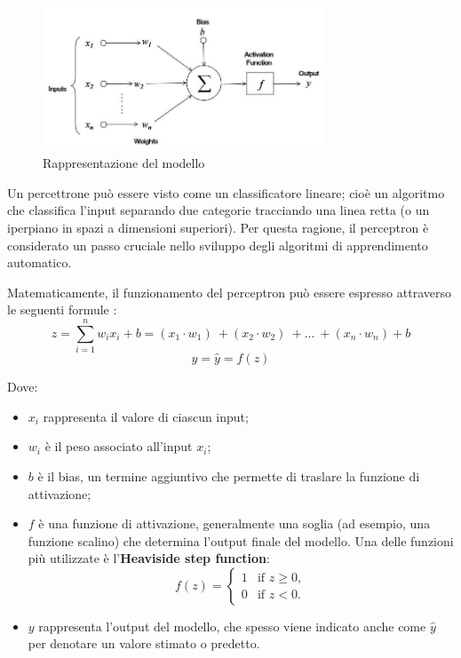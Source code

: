 \begin{figure}[H]
    \centering
    \includegraphics[width=0.75\textwidth]{Immagini/Generiche/neuron_representation_cornell.jpeg}
    \caption{Rappresentazione del modello \cite{IMMAGINE_PERCETTRONE_ASPETTI}}
    \label{fig:modelloNeurone2}
\end{figure}

Un percettrone può essere visto come un classificatore lineare; cioè un algoritmo 
che classifica l'input separando due categorie tracciando una linea retta (o un iperpiano in spazi a dimensioni superiori).
Per questa ragione, il perceptron è considerato un passo cruciale nello sviluppo 
degli algoritmi di apprendimento automatico. 

Matematicamente, il funzionamento del perceptron può essere espresso attraverso 
le seguenti formule \cite{FORMULE_PERCETTRONE}:
\begin{equation}
    z = \sum_{i=1}^{n} w_i x_i + b = (x_1 \cdot w_1)\ + (x_2 \cdot w_2)\ + ...\ + (x_n \cdot w_n) + b 
\end{equation}
\begin{equation}
    y = \hat{y}= f\left(z\right)
\end{equation}

Dove:
\begin{itemize}
    \item \(x_i\) rappresenta il valore di ciascun input;
    \item \(w_i\) è il peso associato all'input \(x_i\);
    \item \(b\) è il bias, un termine aggiuntivo che permette di traslare la funzione di attivazione;
    \item \(f\) è una funzione di attivazione, generalmente una soglia (ad esempio, una funzione scalino) che 
    determina l'output finale del modello. Una delle funzioni più utilizzate è l'\textbf{Heaviside step function}:
    \[f(z) =
        \begin{cases} 
        1 & \text{if } z \ge 0, \\ 
        0 & \text{if } z < 0.
        \end{cases}
    \]
    
    \item \(y\) rappresenta l'output del modello, che spesso viene indicato anche come \(\hat{y}\) per denotare un valore stimato o predetto.
\end{itemize}


